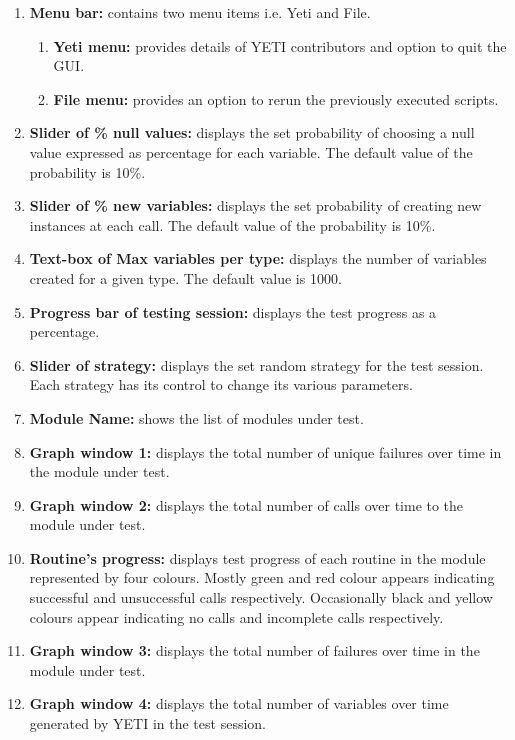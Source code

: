 \begin{enumerate}

\item \textbf{Menu bar:} contains two menu items i.e. Yeti and File.
\begin{enumerate}
\item \textbf{Yeti menu:} provides details of YETI contributors and option to quit the GUI.
\item \textbf{File menu:} provides an option to rerun the previously executed scripts.
\end{enumerate}
\item \textbf{Slider of \% null values:} displays the set probability of choosing a null value expressed as percentage for each variable. The default value of the probability is 10\%. 
\item \textbf{Slider of \% new variables:} displays the set probability of creating new instances at each call. The default value of the probability is 10\%. 
\item \textbf{Text-box of Max variables per type:} displays the number of variables created for a given type. The default value is 1000.
\item \textbf{Progress bar of testing session:} displays the test progress as a percentage.
\item \textbf{Slider of strategy:} displays the set random strategy for the test session. Each strategy has its control to change its various parameters. 
\item \textbf{Module Name:} shows the list of modules under test. 
\item \textbf{Graph window 1:} displays the total number of unique failures over time in the module under test.
\item \textbf{Graph window 2:} displays the total number of calls over time to the module under test.
\item \textbf{Routine's progress:} displays test progress of each routine in the module represented by four colours. Mostly green and red colour appears indicating successful and unsuccessful calls respectively. Occasionally black and yellow colours appear indicating no calls and incomplete calls respectively.
\item \textbf{Graph window 3:} displays the total number of failures over time in the module under test. 
\item \textbf{Graph window 4:} displays the total number of variables over time generated by YETI in the test session.

\end{enumerate}

